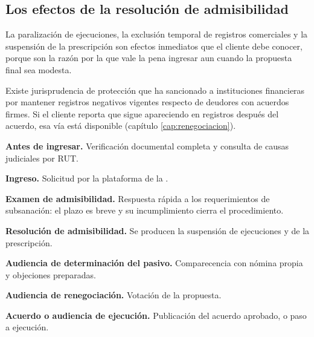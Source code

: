 \subsection{Los efectos de la resolución de admisibilidad}

La paralización de ejecuciones, la exclusión temporal de registros comerciales y la
suspensión de la prescripción son efectos inmediatos que el cliente debe conocer, porque
son la razón por la que vale la pena ingresar aun cuando la propuesta final sea modesta.

\begin{practica}
Existe jurisprudencia de protección que ha sancionado a instituciones financieras por
mantener registros negativos vigentes respecto de deudores con acuerdos firmes. Si el
cliente reporta que sigue apareciendo en registros después del acuerdo, esa vía está
disponible (capítulo \ref{cap:renegociacion}).
\end{practica}

\bloqueCronograma

\begin{checklist}
  \item \textbf{Antes de ingresar.} Verificación documental completa y consulta de causas
  judiciales por RUT.
  \item \textbf{Ingreso.} Solicitud por la plataforma de la \superir{}.
  \item \textbf{Examen de admisibilidad.} Respuesta rápida a los requerimientos de
  subsanación: el plazo es breve y su incumplimiento cierra el procedimiento.
  \item \textbf{Resolución de admisibilidad.} Se producen la suspensión de ejecuciones y
  de la prescripción.
  \item \textbf{Audiencia de determinación del pasivo.} Comparecencia con nómina propia y
  objeciones preparadas.
  \item \textbf{Audiencia de renegociación.} Votación de la propuesta.
  \item \textbf{Acuerdo o audiencia de ejecución.} Publicación del acuerdo aprobado, o
  paso a ejecución.
\end{checklist}

\bloqueErrores

